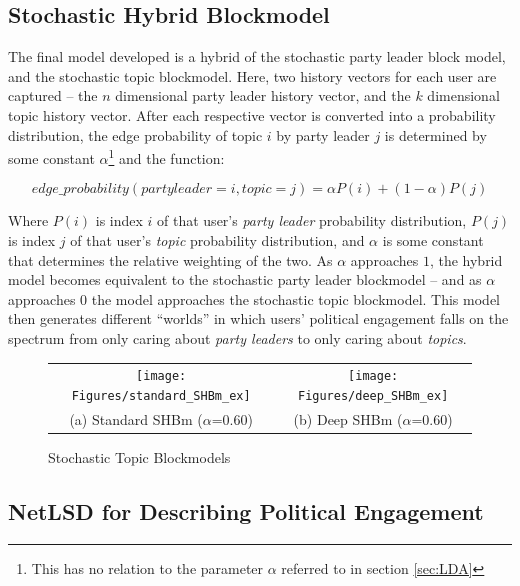 \subsection{Stochastic Hybrid Blockmodel}\label{sec:SHBM}

The final model developed is a hybrid of the stochastic party leader block
model, and the stochastic topic blockmodel. Here, two history vectors for each
user are captured -- the $n$ dimensional party leader history vector, and the
$k$ dimensional topic history vector. After each respective vector is converted
into a probability distribution, the edge probability of topic $i$ by party
leader $j$ is determined by some constant $\alpha$\footnote{This has no relation
to the parameter $\alpha$ referred to in section \ref{sec:LDA}} and the
function:

\begin{equation}
    edge\_probability(party leader=i, topic=j)=\alpha P(i)+(1-\alpha)P(j)
\end{equation}

Where $P(i)$ is index $i$ of that user's \emph{party leader} probability
distribution, $P(j)$ is index $j$ of that user's \emph{topic} probability
distribution, and $\alpha$ is some constant that determines the relative
weighting of the two. As $\alpha$ approaches $1$, the hybrid model becomes
equivalent to the stochastic party leader blockmodel -- and as $\alpha$
approaches $0$ the model approaches the stochastic topic blockmodel. This model
then generates different ``worlds'' in which users' political engagement falls
on the spectrum from only caring about \emph{party leaders} to only caring about
\emph{topics}.

\begin{singlespacing}
    \begin{figure}
        \centering
        \begin{tabular}{cc}
          \texttt{[image: Figures/standard\_SHBm\_ex]} &
          \texttt{[image: Figures/deep\_SHBm\_ex]} \\
        (a) Standard SHBm ($\alpha$=0.60) & (b) Deep SHBm ($\alpha$=0.60)\\[6pt]
        \end{tabular}
        \caption[Stochastic Topic Blockmodels]{Stochastic Topic Blockmodels}
        \label{fig:SHBm_examples}
    \end{figure}
\end{singlespacing}

\subsection{NetLSD for Describing Political Engagement}\label{sec:NetLSDForSBM}

